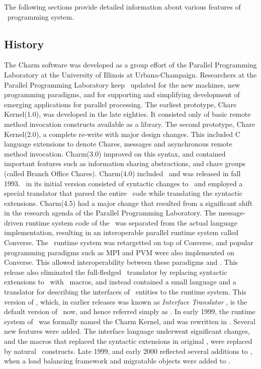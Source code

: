 The following sections provide detailed information about various features of
\charmpp\ programming system.

\subsection{History}

The {\sc Charm} software was developed as a group effort of the Parallel
Programming Laboratory at the University of Illinois at Urbana-Champaign.
Researchers at the Parallel Programming Laboratory keep \charmpp\ updated for
the new machines, new programming paradigms, and for supporting and simplifying
development of emerging applications for parallel processing.  The earliest
prototype, Chare Kernel(1.0), was developed in the late eighties. It consisted
only of basic remote method invocation constructs available as a library.  The
second prototype, Chare Kernel(2.0), a complete re-write with major design
changes.  This included C language extensions to denote Chares, messages and
asynchronous remote method invocation.  {\sc Charm}(3.0) improved on this
syntax, and contained important features such as information sharing
abstractions, and chare groups (called Branch Office Chares).  {\sc Charm}(4.0)
included \charmpp\ and was released in fall 1993.  \charmpp\ in its initial
version consisted of syntactic changes to \CC\ and employed a special
translator that parsed the entire \CC\ code while translating the syntactic
extensions.  {\sc Charm}(4.5)  had a major change that resulted from a
significant shift in the research agenda of the Parallel Programming
Laboratory. The message-driven runtime system code of the \charmpp\ was
separated from the actual language implementation, resulting in an
interoperable parallel runtime system called {\sc
Converse}. The \charmpp\ runtime system was
retargetted on top of {\sc Converse}, and popular programming paradigms such as
MPI and PVM were also implemented on {\sc Converse}. This allowed
interoperability between these paradigms and \charmpp. This release also
eliminated the full-fledged \charmpp\ translator by replacing syntactic
extensions to \CC\ with \CC\ macros, and instead contained a small language and
a translator for describing the interfaces of \charmpp\ entities to the runtime
system.  This version of \charmpp, which, in earlier releases was known as {\em
Interface Translator \charmpp}, is the default version of \charmpp\ now, and
hence referred simply as {\bf \charmpp}.  In early 1999, the runtime system of
\charmpp\ was formally named the Charm Kernel, and was rewritten in \CC.
Several new features were added. The interface language underwent significant
changes, and the macros that replaced the syntactic extensions in original
\charmpp, were replaced by natural \CC\ constructs. Late 1999, and early
2000 reflected several additions to \charmpp{}, when a load balancing
framework and migratable objects were added to \charmpp{}.
